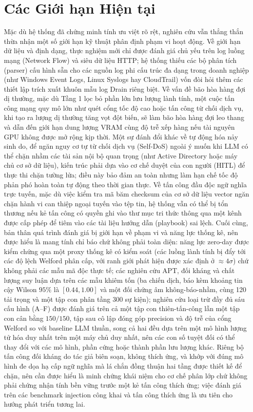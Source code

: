 \section{Các Giới hạn Hiện tại}
Mặc dù hệ thống đã chứng minh tính ưu việt rõ rệt, nghiên cứu vẫn thẳng thắn thừa nhận một số giới hạn kỹ thuật phân định phạm vi hoạt động. Về giới hạn dữ liệu và định dạng, thực nghiệm mới chỉ được đánh giá chủ yếu trên log luồng mạng (Network Flow) và siêu dữ liệu HTTP; hệ thống thiếu các bộ phân tích (parser) cấu hình sẵn cho các nguồn log phi cấu trúc đa dạng trong doanh nghiệp (như Windows Event Logs, Linux Syslogs hay CloudTrail) vốn đòi hỏi thêm các thiết lập trích xuất khuôn mẫu log Drain riêng biệt. Về vấn đề bão hòa hàng đợi dị thường, mặc dù Tầng 1 lọc bỏ phần lớn lưu lượng lành tính, một cuộc tấn công mạng quy mô lớn như quét cổng tốc độ cao hoặc tấn công từ chối dịch vụ, khi tạo ra lượng dị thường tăng vọt đột biến, sẽ làm bão hòa hàng đợi leo thang và dẫn đến giới hạn dung lượng VRAM cùng độ trễ xếp hàng nếu tài nguyên GPU không được mở rộng kịp thời. Một sự đánh đổi khác về tự động hóa nảy sinh do, để ngăn nguy cơ tự từ chối dịch vụ (Self-DoS) ngoài ý muốn khi LLM có thể chặn nhầm các tài sản nội bộ quan trọng (như Active Directory hoặc máy chủ cơ sở dữ liệu), kiến trúc phải dựa vào cơ chế duyệt của con người (HITL) để thực thi chặn tường lửa; điều này bảo đảm an toàn nhưng làm hạn chế tốc độ phản phó hoàn toàn tự động theo thời gian thực. Về tấn công đầu độc ngữ nghĩa trực tuyến, mặc dù việc kiểm tra mã băm checksum của cơ sở dữ liệu vector ngăn chặn hành vi can thiệp ngoại tuyến vào tệp tin, hệ thống vẫn có thể bị tổn thương nếu kẻ tấn công có quyền ghi vào thư mục tri thức thông qua một kênh được cấp phép để tiêm vào các tài liệu hướng dẫn (playbook) sai lệch. Cuối cùng, bản thân quá trình đánh giá bị giới hạn về phạm vi và năng lực thống kê, nên được hiểu là mang tính chỉ báo chứ không phải toàn diện: năng lực zero-day được kiểm chứng qua một proxy thống kê có kiểm soát (các luồng lành tính bị đẩy tới các độ lệch Welford phân cấp, với ranh giới phát hiện được xác định ở $\approx 4\sigma$) chứ không phải các mẫu mã độc thực tế; các nghiên cứu APT, đối kháng và chất lượng suy luận dựa trên các mẫu khiêm tốn (ba chiến dịch, báo kèm khoảng tin cậy Wilson $95\%$ là $[0.44, 1.00]$ và một đối chứng âm không-báo-nhầm, cùng 120 tải trọng và một tập con phân tầng 300 sự kiện); nghiên cứu loại trừ đầy đủ sáu cấu hình (A--F) được đánh giá trên cả một tập con thiên-tấn-công lẫn một tập con cân bằng $150/150$, tập sau cô lập đóng góp precision và độ trễ của cổng Welford so với baseline LLM thuần, song cả hai đều dựa trên một mô hình lượng tử hóa duy nhất trên một máy chủ duy nhất, nên các con số tuyệt đối có thể thay đổi với các mô hình, phần cứng hoặc thành phần lưu lượng khác. Riêng bộ tấn công đối kháng do tác giả biên soạn, không thích ứng, và khớp với đúng mô hình đe dọa hạ cấp ngữ nghĩa mà lá chắn đồng thuận hai tầng được thiết kế để chặn, nên cần được hiểu là minh chứng khái niệm cho cơ chế phân lớp chứ không phải chứng nhận tính bền vững trước một kẻ tấn công thích ứng; việc đánh giá trên các benchmark injection công khai và tấn công thích ứng là ưu tiên cho hướng phát triển tương lai.

